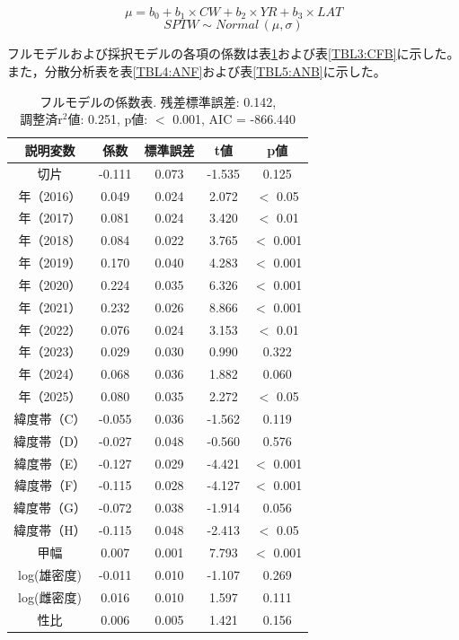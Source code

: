 \[ \mu = b_{0} + b_{1} \times CW + b_{2} \times YR + b_{3} \times LAT \]
\[ SPTW \sim \textit{Normal} \, (\mu, \sigma) \]

フルモデルおよび採択モデルの各項の係数は表\ref{TBL2:CFF}および表\ref{TBL3:CFB}に示した。また，分散分析表を表\ref{TBL4:ANF}および表\ref{TBL5:ANB}に示した。

\begin{table}[htbp]


	\caption{フルモデルの係数表. 残差標準誤差: 0.142, \\ 
	調整済r$^{2}$値: 0.251, p値: $<$ 0.001, AIC = -866.440}
	 \label{TBL2:CFF}
	 \begin{center}
	  {\setlength{\tabcolsep}{4pt}\footnotesize
	  \begin{tabular}{ccccc} \hline
説明変数     & 係数   & 標準誤差 & t値    & p値        \\ \hline
切片        & -0.111 & 0.073 & -1.535 & 0.125       \\
年（2016）  & 0.049  & 0.024 & 2.072  &  $<$ 0.05  \\
年（2017）  & 0.081  & 0.024 & 3.420  & $<$ 0.01   \\
年（2018）  & 0.084  & 0.022 & 3.765  & $<$ 0.001  \\
年（2019）  & 0.170  & 0.040 & 4.283  & $<$ 0.001  \\
年（2020）  & 0.224  & 0.035 & 6.326  & $<$ 0.001  \\
年（2021）  & 0.232  & 0.026 & 8.866  & $<$ 0.001  \\
年（2022）  & 0.076  & 0.024 & 3.153  & $<$ 0.01   \\
年（2023）  & 0.029  & 0.030 & 0.990  & 0.322       \\
年（2024）  & 0.068  & 0.036 & 1.882  & 0.060       \\
年（2025）  & 0.080  & 0.035 & 2.272  & $<$ 0.05   \\
緯度帯（C）  & -0.055 & 0.036 & -1.562 & 0.119       \\
緯度帯（D）  & -0.027 & 0.048 & -0.560 & 0.576       \\
緯度帯（E）  & -0.127 & 0.029 & -4.421 & $<$ 0.001  \\
緯度帯（F）  & -0.115 & 0.028 & -4.127 & $<$ 0.001  \\
緯度帯（G）  & -0.072 & 0.038 & -1.914 & 0.056       \\
緯度帯（H）  & -0.115 & 0.048 & -2.413 & $<$ 0.05   \\
甲幅        & 0.007  & 0.001 & 7.793  & $<$ 0.001 \\
log(雄密度)  & -0.011 & 0.010 & -1.107 & 0.269       \\
log(雌密度) & 0.016  & 0.010 & 1.597  & 0.111      \\
性比         & 0.006  & 0.005 & 1.421  & 0.156       \\ \hline
	  \end{tabular}}
	 \end{center}
	
	\end{table}%

